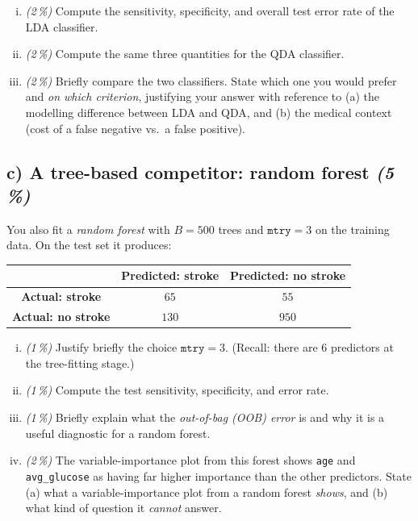 \documentclass[11pt,a4paper]{article}
\newcommand{\subpoints}[1]{\textit{(#1\,\%)}}
\begin{document}
\begin{enumerate}[(i)]
  \item \subpoints{2} Compute the sensitivity, specificity, and overall test error rate of the LDA classifier.
  \item \subpoints{2} Compute the same three quantities for the QDA classifier.
  \item \subpoints{2} Briefly compare the two classifiers. State which one you would prefer and \emph{on which criterion}, justifying your answer with reference to (a) the modelling difference between LDA and QDA, and (b) the medical context (cost of a false negative vs.\ a false positive).
\end{enumerate}

\subsection*{c) A tree-based competitor: random forest \subpoints{5}}

You also fit a \emph{random forest} with $B = 500$ trees and $\mathtt{mtry} = 3$ on the training data. On the test set it produces:

\begin{center}\small
\begin{tabular}{c|cc}
 & \textbf{Predicted: stroke} & \textbf{Predicted: no stroke} \\ \hline
\textbf{Actual: stroke}    & $65$  & $55$  \\
\textbf{Actual: no stroke} & $130$ & $950$ \\
\end{tabular}
\end{center}

\begin{enumerate}[(i)]
  \item \subpoints{1} Justify briefly the choice $\mathtt{mtry} = 3$. (Recall: there are $6$ predictors at the tree-fitting stage.)
  \item \subpoints{1} Compute the test sensitivity, specificity, and error rate.
  \item \subpoints{1} Briefly explain what the \emph{out-of-bag (OOB) error} is and why it is a useful diagnostic for a random forest.
  \item \subpoints{2} The variable-importance plot from this forest shows \texttt{age} and \texttt{avg\_glucose} as having far higher importance than the other predictors. State (a) what a variable-importance plot from a random forest \emph{shows}, and (b) what kind of question it \emph{cannot} answer.
\end{enumerate}
\end{document}
